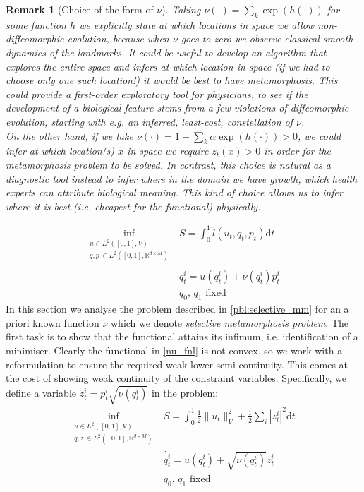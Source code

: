 \documentclass{article}
\newtheorem{remark}{Remark}
\newcommand{\half}{\frac 12}
\newcommand{\norm}[2]{\| #1 \|_{ #2 }}
\newcommand{\vnorm}[1]{\norm{ #1 }{V}}
\newcommand{\diff}[1]{\text{d} #1}
\newcommand{\RdM}{\mathbb{R}^{d\times M}}
\begin{document}
\begin{remark}[Choice of the form of $\nu$]
Taking $\nu(\cdot) = \sum_k \exp(h(\cdot))$ for some function $h$ we explicitly
state at which locations in space we allow non-diffeomorphic evolution, because
when $\nu$ goes to zero we observe classical smooth dynamics of the landmarks.
It could be useful to develop an algorithm that explores the entire space and
infers at which location in space (if we had to choose only one such location!)
it would be best to have metamorphosis. This could provide a first-order
exploratory tool for physicians, to see if the development of a biological
feature stems from a few violations of diffeomorphic evolution, starting with
e.g. an inferred, least-cost, constellation of $\nu$.\\

On the other hand, if we take $\nu(\cdot) = 1 - \sum_k \alpha \exp(h(\cdot))>0$,
we could infer at which location(s) $x$ in space we require $z_t(x)>0$ in order
for the metamorphosis problem to be solved. In contrast, this choice is natural
as a diagnostic tool instead to infer where in the domain we have growth, which
health experts can attribute biological meaning. This kind of choice allows us
to infer where it is best (i.e. cheapest for the functional) \emph{physically}.
\end{remark}

\begin{subequations}\label{pbl:selective_mm}
\begin{align}
\inf_{\substack{u \in L^2([0,1],V)\\ q, p\, \in L^2([0,1],\RdM)}} & S = \int_0^1 \hat l(u_t, q_t, p_t)\diff{t}\label{nu_fnl}\\
& \dot{q_t^i} =  u(q_t^i) + \nu(q^i_t)p^i_t \\
    & q_0,\,q_1\text{ fixed}
\end{align}
\end{subequations}
In this section we analyse the problem described in \eqref{pbl:selective_mm} for
an a priori known function $\nu$ which we denote \emph{selective metamorphosis
problem}. The first task is to show that the functional attains its infimum,
i.e. identification of a minimiser. Clearly the functional in \eqref{nu_fnl} is
not convex, so we work with a reformulation to ensure the required weak lower
semi-continuity. This comes at the cost of showing weak continuity of the
constraint variables. Specifically, we define a variable $z^i_t = p^i_t
\sqrt{\nu(q_t^i)}$ in the problem:
\begin{subequations}\label{pbl:reformulation}
\begin{align}
\inf_{\substack{u \in L^2([0,1],V)\\ q, z\, \in L^2([0,1],\RdM)}}
    & S = \int_0^1 \half\vnorm{u_t}^2 + \half\sum_i |z_t^i|^2 \diff{t}\\
    & \dot{q_t^i} = u(q_t^i) + \sqrt{\nu(q_t^i)} z^i_t\\
    & q_0,\,q_1\text{ fixed}
\end{align}
\end{subequations}
\end{document}
